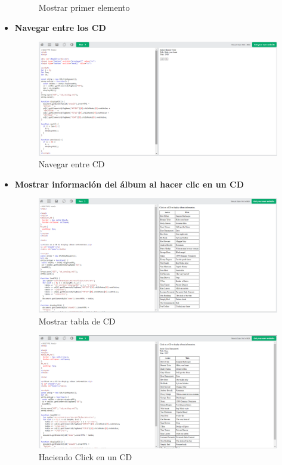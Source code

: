 \documentclass{article}
\begin{document}
\begin{itemize}
\begin{figure}[H]
			\caption{Mostrar primer elemento}
		\end{figure}
		\item \textbf{Navegar entre los CD}
		\begin{figure}[H]
			\centering
			\includegraphics[width=1\textwidth,keepaspectratio]{img/ejemplo20.png}
			\caption{Navegar entre CD}
		\end{figure}
		\newpage
		\item \textbf{Mostrar información del álbum al hacer clic en un CD}
		\begin{figure}[H]
			\centering
			\includegraphics[width=1\textwidth,keepaspectratio]{img/ejemplo21.png}
			\caption{Mostrar tabla de CD}
		\end{figure}
		\begin{figure}[H]
			\centering
			\includegraphics[width=1\textwidth,keepaspectratio]{img/seleccion2.png}
			\caption{Haciendo Click en un CD}
		\end{figure}
	\end{itemize}
	\newpage
\end{document}
